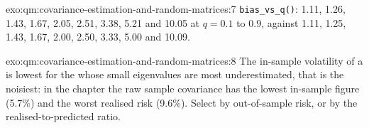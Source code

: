 \begin{solution}{exo:qm:covariance-estimation-and-random-matrices:7}
\texttt{bias\_vs\_q()}: 1.11, 1.26, 1.43, 1.67, 2.05, 2.51, 3.38, 5.21 and 10.05 at $q = 0.1$ to 0.9, against 1.11, 1.25, 1.43, 1.67, 2.00, 2.50, 3.33, 5.00 and 10.09.
\end{solution}

\begin{solution}{exo:qm:covariance-estimation-and-random-matrices:8}
The in-sample volatility of a  is lowest for the  whose small eigenvalues are most underestimated, that is the noisiest: in the chapter the raw
sample covariance has the lowest in-sample figure (5.7\%) and the worst realised risk (9.6\%). Select  by out-of-sample risk, or by the realised-to-predicted ratio.
\end{solution}

